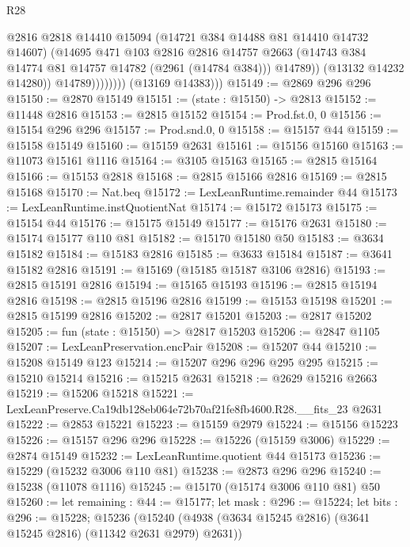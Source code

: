 \begin{lexlean}{R28}
\begin{coremodule}
                            @2816
                            @2818
                            @14410
                            @15094
                            (@14721 @384 @14488 @81 @14410 @14732 @14607)
                            (@14695
                              @471
                              @103
                              @2816
                              @2816
                              @14757
                              @2663
                              (@14743 @384 @14774 @81 @14757 @14782 (@2961 (@14784 @384)))
                              @14789))
                          (@13132 @14232 @14280))
                        @14789))))))))
        (@13169 @14383)))
@15149 := @2869 @296 @296
@15150 := @2870 @15149
@15151 := (state : @15150) -> @2813
@15152 := @11448 @2816
@15153 := @2815 @15152
@15154 := Prod.fst.{0, 0}
@15156 := @15154 @296 @296
@15157 := Prod.snd.{0, 0}
@15158 := @15157 @44
@15159 := @15158 @15149
@15160 := @15159 @2631
@15161 := @15156 @15160
@15163 := @11073 @15161 @1116
@15164 := @3105 @15163
@15165 := @2815 @15164
@15166 := @15153 @2818
@15168 := @2815 @15166 @2816
@15169 := @2815 @15168
@15170 := Nat.beq
@15172 := LexLeanRuntime.remainder @44
@15173 := LexLeanRuntime.instQuotientNat
@15174 := @15172 @15173
@15175 := @15154 @44
@15176 := @15175 @15149
@15177 := @15176 @2631
@15180 := @15174 @15177 @110 @81
@15182 := @15170 @15180 @50
@15183 := @3634 @15182
@15184 := @15183 @2816
@15185 := @3633 @15184
@15187 := @3641 @15182 @2816
@15191 := @15169 (@15185 @15187 @3106 @2816)
@15193 := @2815 @15191 @2816
@15194 := @15165 @15193
@15196 := @2815 @15194 @2816
@15198 := @2815 @15196 @2816
@15199 := @15153 @15198
@15201 := @2815 @15199 @2816
@15202 := @2817 @15201
@15203 := @2817 @15202
@15205 := fun (state : @15150) => @2817 @15203
@15206 := @2847 @1105
@15207 := LexLeanPreservation.encPair
@15208 := @15207 @44
@15210 := @15208 @15149 @123
@15214 := @15207 @296 @296 @295 @295
@15215 := @15210 @15214
@15216 := @15215 @2631
@15218 := @2629 @15216 @2663
@15219 := @15206 @15218
@15221 := LexLeanPreserve.Ca19db128eb064e72b70af21fe8fb4600.R28.__fits_23 @2631
@15222 := @2853 @15221
@15223 := @15159 @2979
@15224 := @15156 @15223
@15226 := @15157 @296 @296
@15228 := @15226 (@15159 @3006)
@15229 := @2874 @15149
@15232 := LexLeanRuntime.quotient @44 @15173
@15236 := @15229 (@15232 @3006 @110 @81)
@15238 := @2873 @296 @296
@15240 := @15238 (@11078 @1116)
@15245 := @15170 (@15174 @3006 @110 @81) @50
@15260 := let remaining : @44 := @15177;
  let mask : @296 := @15224;
  let bits : @296 := @15228;
  @15236 (@15240 (@4938 (@3634 @15245 @2816) (@3641 @15245 @2816) (@11342 @2631 @2979) @2631))

\end{coremodule}
\end{lexlean}
